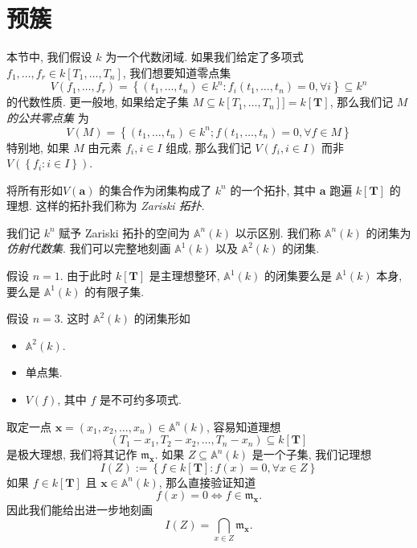 \section{预簇}

本节中, 我们假设 \( k \) 为一个代数闭域. 如果我们给定了多项式 \( f_1, \ldots,
f_r \in k[T_1, \ldots, T_n] \), 我们想要知道零点集
\[
  V(f_1, \ldots, f_r) = \left\lbrace (t_1, \ldots, t_n) \in k^n: f_i(t_1,
  \ldots, t_n) = 0, \forall i \right\rbrace \subseteq k^n
\]
的代数性质. 更一般地, 如果给定子集 \( M \subseteq k[T_1, \ldots, T_n] ] =
k[\mathbf{T}] \), 那么我们记  \emph{\( M \) 的公共零点集} 为
\[
  V(M) = \left\lbrace (t_1, \ldots, t_n) \in k^n; f(t_1, \ldots, t_n) = 0,
  \forall f \in M \right\rbrace
\]
特别地, 如果 \( M \) 由元素 \( f_i, i \in I \) 组成, 那么我们记 \( V(f_i, i \in
I) \) 而非 \( V(\left\lbrace f_i: i \in I \right\rbrace) \).

\begin{proposition}
  将所有形如\( V(\mathbf{a}) \) 的集合作为闭集构成了 \( k^n \) 的一个拓扑, 其中
  \( \mathbf{a} \) 跑遍 \( k[\mathbf{T}] \) 的理想. 这样的拓扑我们称为
  \emph{Zariski 拓扑}.
\end{proposition}

我们记 \( k^n \) 赋予 Zariski 拓扑的空间为 \( \mathbb{A}^n(k) \) 以示区别.
我们称 \( \mathbb{A}^n(k) \) 的闭集为 \emph{仿射代数集}. 我们可以完整地刻画 \(
\mathbb{A}^1(k) \) 以及 \( \mathbb{A}^2(k) \) 的闭集.

\begin{example}
  假设 \( n = 1 \). 由于此时 \( k[\mathbf{T}] \) 是主理想整环, \(
  \mathbb{A}^1(k) \) 的闭集要么是 \( \mathbb{A}^1(k) \) 本身, 要么是 \(
  \mathbb{A}^1(k) \) 的有限子集.
\end{example}

\begin{example}
  假设 \( n = 3 \). 这时 \( \mathbb{A}^2(k) \) 的闭集形如
  \begin{itemize}
    \item \( \mathbb{A}^2(k) \).
    \item 单点集.
    \item \( V(f) \), 其中 \( f \) 是不可约多项式.
  \end{itemize}
\end{example}

取定一点 \( \mathbf{x} = (x_1, x_2, \ldots, x_n) \in \mathbb{A}^n(k) \), 容易知道理想
\[
  (T_1 - x_1, T_2 - x_2, \ldots, T_n - x_n) \subseteq k[\mathbf{T}]
\]
是极大理想, 我们将其记作 \( \mathfrak{m}_{\mathbf{x}} \).
如果 \( Z \subseteq \mathbb{A}^n(k) \) 是一个子集, 我们记理想
\[
  I(Z) := \left\lbrace f \in k[\mathbf{T}]: f(x) = 0, \forall x \in Z
  \right\rbrace
\]
如果 \( f \in k[\mathbf{T}] \) 且 \( \mathbf{x} \in \mathbb{A}^n(k) \),
那么直接验证知道
\[
  f(x) = 0 \iff f \in \mathfrak{m}_{\mathbf{x}}.
\]
因此我们能给出进一步地刻画
\[
  I(Z) = \bigcap_{x \in Z}\mathfrak{m}_{\mathbf{x}}.
\]

